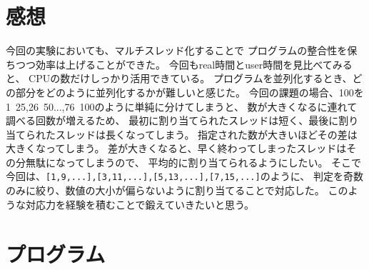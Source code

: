 \documentclass[a4j]{jarticle}
\begin{document}
\section{感想}
今回の実験においても、マルチスレッド化することで
プログラムの整合性を保ちつつ効率は上げることができた。
今回もreal時間とuser時間を見比べてみると、
CPUの数だけしっかり活用できている。
プログラムを並列化するとき、どの部分をどのように並列化するかが難しいと感じた。
今回の課題の場合、100を1~25,26~50...,76~100のように単純に分けてしまうと、
数が大きくなるに連れて調べる回数が増えるため、
最初に割り当てられたスレッドは短く、最後に割り当てられたスレッドは長くなってしまう。
指定された数が大きいほどその差は大きくなってしまう。
差が大きくなると、早く終わってしまったスレッドはその分無駄になってしまうので、
平均的に割り当てられるようにしたい。
そこで今回は、\verb|[1,9,...],[3,11,...],[5,13,...],[7,15,...]|のように、
判定を奇数のみに絞り、数値の大小が偏らないように割り当てることで対応した。
このような対応力を経験を積むことで鍛えていきたいと思う。

\section{プログラム}


\end{document}
